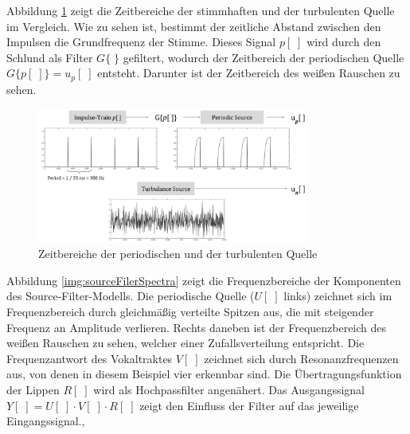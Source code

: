 Abbildung \ref{img:glottalSource} zeigt die Zeitbereiche der stimmhaften und der turbulenten Quelle im Vergleich. Wie zu sehen ist, bestimmt der zeitliche Abstand zwischen den Impulsen die Grundfrequenz der Stimme. Dieses Signal $p[\;]$ wird durch den Schlund als Filter $G\{ \; \}$ gefiltert, wodurch der Zeitbereich der periodischen Quelle $G\{p[\;]\} = u_p[\;]$ entsteht. Darunter ist der Zeitbereich des weißen Rauschen zu sehen.\cite[Source]{speechAcoustics}

\begin{figure}[H]
	\centering
	\includegraphics[width=0.8\textwidth]{bilder/glottalSource.png}
	\caption[Zeitbereiche der periodischen und der turbulenten Quelle]{Zeitbereiche der periodischen und der turbulenten Quelle \cite[Source]{speechAcoustics}}
	\label{img:glottalSource}
\end{figure}	

Abbildung \ref{img:sourceFilerSpectra} zeigt die Frequenzbereiche der Komponenten des Source-Filter-Modells. Die periodische Quelle ($U[\;]$ links) zeichnet sich im Frequenzbereich durch gleichmäßig verteilte Spitzen aus, die mit steigender Frequenz an Amplitude verlieren. Rechts daneben ist der Frequenzbereich des weißen Rauschen zu sehen, welcher einer Zufallsverteilung entspricht. Die Frequenzantwort des Vokaltraktes $V[\;]$ zeichnet sich durch Resonanzfrequenzen aus, von denen in diesem Beispiel vier  erkennbar sind. Die Übertragungsfunktion der Lippen $R[\;]$ wird als Hochpassfilter angenähert. Das Ausgangssignal $Y[\;] = U[\;] \cdot V[\;] \cdot R[\;]$ zeigt den Einfluss der Filter auf das jeweilige Eingangssignal.\cite[\emph{Source estimation}]{ricardo_ceps}, \cite[\emph{Vocal Tract Resonance}]{speechAcoustics}


